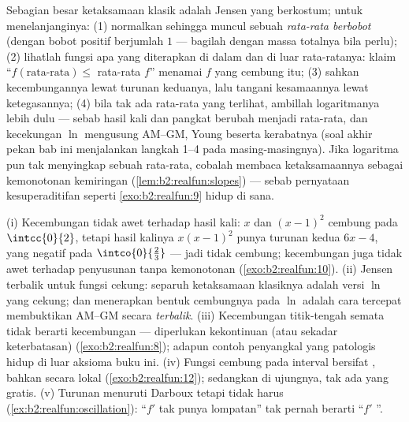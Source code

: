 \begin{method}\label{met:b2:realfun:spotting}
Sebagian besar ketaksamaan klasik adalah Jensen yang berkostum; untuk
menelanjanginya: (1) normalkan sehingga muncul sebuah \emph{rata-rata
berbobot} (dengan bobot positif berjumlah $1$ --- bagilah dengan massa
totalnya bila perlu); (2) lihatlah fungsi apa yang diterapkan di dalam
dan di luar rata-ratanya: klaim ``$f(\text{rata-rata}) \leq$
rata-rata $f$'' menamai $f$ yang cembung itu; (3) sahkan kecembungannya
lewat turunan keduanya, lalu tangani kesamaannya lewat ketegasannya; (4)
bila tak ada rata-rata yang terlihat, ambillah logaritmanya lebih dulu
--- sebab hasil kali dan pangkat berubah menjadi rata-rata, dan
kecekungan $\ln$ mengusung AM--GM, Young beserta kerabatnya (soal akhir
pekan bab ini menjalankan langkah 1--4 pada masing-masingnya). Jika
logaritma pun tak menyingkap sebuah rata-rata, cobalah membaca
ketaksamaannya sebagai kemonotonan kemiringan
(\cref{lem:b2:realfun:slopes}) --- sebab pernyataan kesuperaditifan
seperti \cref{exo:b2:realfun:9} hidup di sana.
\end{method}

\begin{remark}\label{rem:b2:realfun:pitfalls}
(i) Kecembungan tidak awet terhadap hasil kali: $x$ dan $(x - 1)^2$
cembung pada $\intcc{0}{2}$, tetapi hasil kalinya $x(x-1)^2$ punya
turunan kedua $6x - 4$, yang negatif pada
$\intco{0}{\frac23}$ --- jadi tidak cembung; kecembungan juga tidak awet
terhadap penyusunan tanpa kemonotonan
(\cref{exo:b2:realfun:10}). (ii) Jensen terbalik untuk fungsi
cekung: separuh ketaksamaan klasiknya adalah versi $\ln$ yang
cekung; dan menerapkan bentuk cembungnya pada $\ln$ adalah cara
tercepat membuktikan AM--GM secara \emph{terbalik}. (iii) Kecembungan
titik-tengah semata tidak berarti kecembungan --- diperlukan
kekontinuan (atau sekadar keterbatasan) (\cref{exo:b2:realfun:8});
adapun contoh penyangkal yang patologis hidup di luar aksioma buku ini.
(iv) Fungsi cembung pada interval \emph{} bersifat ,
bahkan  secara lokal (\cref{exo:b2:realfun:12}); sedangkan di
ujungnya, tak ada yang gratis. (v) Turunan menuruti Darboux tetapi
tidak harus  (\cref{ex:b2:realfun:oscillation}):
``$f'$ tak punya lompatan'' tak pernah berarti ``$f'$ ''.
\end{remark}

